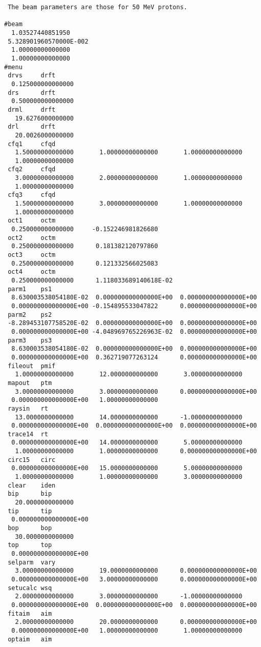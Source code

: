 \begin{footnotesize}
\begin{verbatim}
 The beam parameters are those for 50 MeV protons.

#beam
  1.03527440851950
 5.328901960570000E-002
  1.00000000000000
  1.00000000000000
#menu
 drvs     drft
  0.125000000000000
 drs      drft
  0.500000000000000
 drml     drft
   19.6276000000000
 drl      drft
   20.0026000000000
 cfq1     cfqd
   1.50000000000000       1.00000000000000       1.00000000000000
   1.00000000000000
 cfq2     cfqd
   3.00000000000000       2.00000000000000       1.00000000000000
   1.00000000000000
 cfq3     cfqd
   1.50000000000000       3.00000000000000       1.00000000000000
   1.00000000000000
 oct1     octm
  0.250000000000000     -0.152246981826680
 oct2     octm
  0.250000000000000      0.181382120797860
 oct3     octm
  0.250000000000000      0.121332566025083
 oct4     octm
  0.250000000000000      1.118033689140618E-02
 parm1    ps1
  8.630003538054180E-02  0.000000000000000E+00  0.000000000000000E+00
  0.000000000000000E+00 -0.154895533047822      0.000000000000000E+00
 parm2    ps2
 -8.289453107758520E-02  0.000000000000000E+00  0.000000000000000E+00
  0.000000000000000E+00 -4.048969765226963E-02  0.000000000000000E+00
 parm3    ps3
  8.630003538054180E-02  0.000000000000000E+00  0.000000000000000E+00
  0.000000000000000E+00  0.362719077263124      0.000000000000000E+00
 fileout  pmif
   1.00000000000000       12.0000000000000       3.00000000000000
 mapout   ptm
   3.00000000000000       3.00000000000000      0.000000000000000E+00
  0.000000000000000E+00   1.00000000000000
 raysin   rt
   13.0000000000000       14.0000000000000      -1.00000000000000
  0.000000000000000E+00  0.000000000000000E+00  0.000000000000000E+00
 trace14  rt
  0.000000000000000E+00   14.0000000000000       5.00000000000000
   1.00000000000000       1.00000000000000      0.000000000000000E+00
 circ15   circ
  0.000000000000000E+00   15.0000000000000       5.00000000000000
   1.00000000000000       1.00000000000000       3.00000000000000
 clear    iden
 bip      bip
   20.0000000000000
 tip      tip
  0.000000000000000E+00
 bop      bop
   30.0000000000000
 top      top
  0.000000000000000E+00
 selparm  vary
   3.00000000000000       19.0000000000000      0.000000000000000E+00
  0.000000000000000E+00   3.00000000000000      0.000000000000000E+00
 setucalc wsq
   2.00000000000000       3.00000000000000      -1.00000000000000
  0.000000000000000E+00  0.000000000000000E+00  0.000000000000000E+00
 fitaim   aim
   2.00000000000000       20.0000000000000      0.000000000000000E+00
  0.000000000000000E+00   1.00000000000000       1.00000000000000
 optaim   aim

\end{verbatim}
\end{footnotesize}
